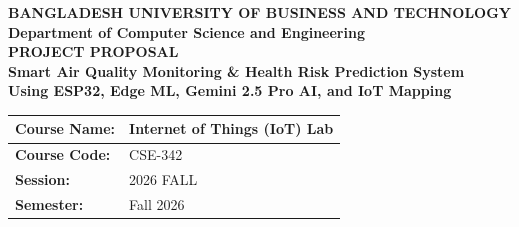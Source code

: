 \documentclass[12pt,a4paper]{report}
\begin{document}
\begin{titlepage}
    \singlespacing
    \begin{center}
        \vspace*{0.5cm}
        
        {\LARGE \textbf{BANGLADESH UNIVERSITY OF BUSINESS AND TECHNOLOGY}}\\[0.5cm]
        {\Large \textbf{Department of Computer Science and Engineering}}\\[2cm]
        
        {\Huge \textbf{PROJECT PROPOSAL}}\\[2cm]
        
        {\LARGE \textbf{Smart Air Quality Monitoring \& Health Risk Prediction System}}\\[0.5cm]
        {\Large \textbf{Using ESP32, Edge ML, Gemini 2.5 Pro AI, and IoT Mapping}}\\[2cm]
        
        \begin{table}[H]
            \centering
            \large
            \begin{tabular}{|l|l|}
                \hline
                \textbf{Course Name:} & Internet of Things (IoT) Lab \\ \hline
                \textbf{Course Code:} & CSE-342 \\ \hline
                \textbf{Session:} & 2026 FALL \\ \hline
                \textbf{Semester:} & Fall 2026 \\ \hline
            \end{tabular}
        \end{table}
        
        \vspace{2cm}
        

\end{center}
\end{titlepage}
\end{document}
